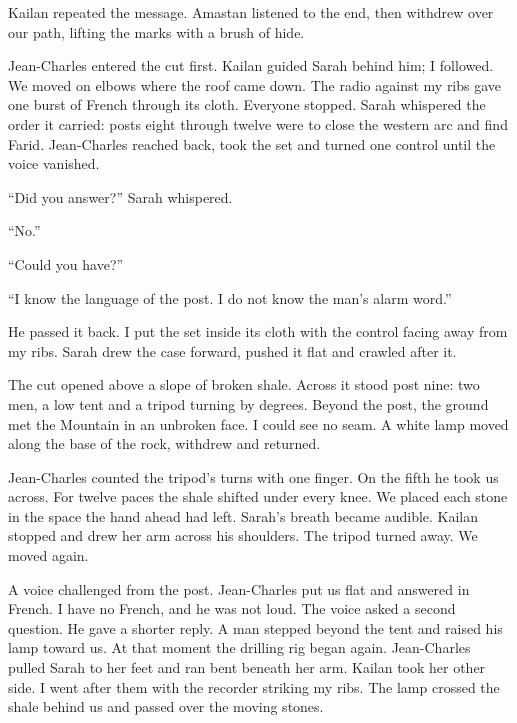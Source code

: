 Kailan repeated the message. Amastan listened to the end, then withdrew over our path, lifting the marks with a brush of hide.\par

Jean-Charles entered the cut first. Kailan guided Sarah behind him; I followed. We moved on elbows where the roof came down. The radio against my ribs gave one burst of French through its cloth. Everyone stopped. Sarah whispered the order it carried: posts eight through twelve were to close the western arc and find Farid. Jean-Charles reached back, took the set and turned one control until the voice vanished.\par

``Did you answer?'' Sarah whispered.\par

``No.''\par

``Could you have?''\par

``I know the language of the post. I do not know the man's alarm word.''\par

He passed it back. I put the set inside its cloth with the control facing away from my ribs. Sarah drew the case forward, pushed it flat and crawled after it.\par

The cut opened above a slope of broken shale. Across it stood post nine: two men, a low tent and a tripod turning by degrees. Beyond the post, the ground met the Mountain in an unbroken face. I could see no seam. A white lamp moved along the base of the rock, withdrew and returned.\par

Jean-Charles counted the tripod's turns with one finger. On the fifth he took us across. For twelve paces the shale shifted under every knee. We placed each stone in the space the hand ahead had left. Sarah's breath became audible. Kailan stopped and drew her arm across his shoulders. The tripod turned away. We moved again.\par

A voice challenged from the post. Jean-Charles put us flat and answered in French. I have no French, and he was not loud. The voice asked a second question. He gave a shorter reply. A man stepped beyond the tent and raised his lamp toward us. At that moment the drilling rig began again. Jean-Charles pulled Sarah to her feet and ran bent beneath her arm. Kailan took her other side. I went after them with the recorder striking my ribs. The lamp crossed the shale behind us and passed over the moving stones.\par

